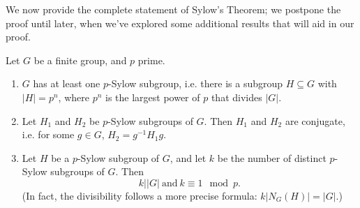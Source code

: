 \documentclass[math1530-lecture-notes]{subfiles}
\begin{document}
We now provide the complete statement of Sylow's Theorem; we postpone the proof until later, when
we've explored some additional results that will aid in our proof.
\begin{theorem}{}
  Let $G$ be a finite group, and $p$ prime.
  \begin{enumerate}
    \item $G$ has at least one $p$-Sylow subgroup, i.e. there is a subgroup $H\subseteq G$ with
      $\left| H \right| =p^n$, where $p^n$ is the largest power of $p$ that divides $\left| G
      \right| $.
    \item Let $H_1$ and $H_2$ be $p$-Sylow subgroups of $G$. Then $H_1$ and $H_2$ are conjugate,
      i.e. for some $g\in G$, $H_2=g^{-1}H_1g$.
    \item Let $H$ be a $p$-Sylow subgroup of $G$, and let $k$ be the number of distinct $p$-Sylow
      subgroups of $G$. Then \[
        k|\left| G \right| ~\text{and}~k\equiv 1\mod{p}
      .\] (In fact, the divisibility follows a more precise formula: $k\left| N_G(H) \right| =\left|
      G\right| $.)
  \end{enumerate}
\end{theorem}
\end{document}
